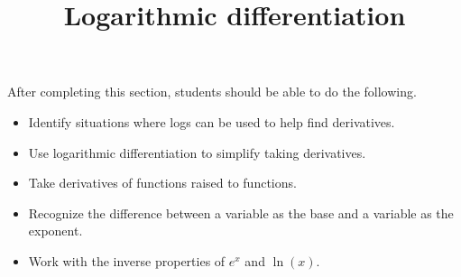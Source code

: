 \documentclass{ximera}
\title{Logarithmic differentiation}
\begin{document}
\begin{abstract}
\end{abstract}

\maketitle

\begin{sectionOutcomes}

After completing this section, students should be able to do the following.

\begin{itemize}
	\item Identify situations where logs can be used to help find derivatives.
	\item Use logarithmic differentiation to simplify taking derivatives.
	\item Take derivatives of functions raised to functions.
	\item Recognize the difference between a variable as the base and a variable as the exponent.
	\item Work with the inverse properties of $e^x$ and $\ln(x)$.
\end{itemize}

\end{sectionOutcomes}
\end{document}
